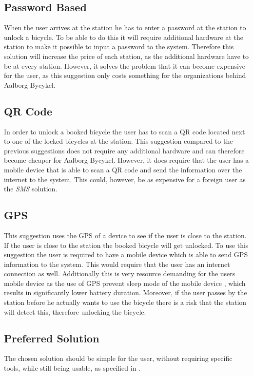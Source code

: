 \subsection{Password Based}
When the user arrives at the station he has to enter a password at the station to unlock a bicycle.
To be able to do this it will require additional hardware at the station to make it possible to input a password to the system.
Therefore this solution will increase the price of each station, as the additional hardware have to be at every station.
However, it solves the problem that it can become expensive for the user, as this suggestion only costs something for the organizations behind Aalborg Bycykel.

\subsection{QR Code}
In order to unlock a booked bicycle the user has to scan a QR code located next to one of the locked bicycles at the station.
This suggestion compared to the previous suggestions does not require any additional hardware and can therefore become cheaper for Aalborg Bycykel.
However, it does require that the user has a mobile device that is able to scan a QR code and send the information over the internet to the system. This could, however, be as expensive for a foreign user as the \textit{SMS} solution.

\subsection{GPS}
This suggestion uses the GPS of a device to see if the user is close to the station.
If the user is close to the station the booked bicycle will get unlocked.
To use this suggestion the user is required to have a mobile device which is able to send GPS information to the system.
This would require that the user has an internet connection as well.
Additionally this is very resource demanding for the users mobile device as the use of GPS prevent sleep mode of the mobile device \citep{misc:gpsbatteryusage}, which results in significantly lower battery duration.
Moreover, if the user passes by the station before he actually wants to use the bicycle there is a risk that the station will detect this, therefore unlocking the bicycle.

\subsection{Preferred Solution}
The chosen solution should be simple for the user, without requiring specific tools, while still being usable, as specified in .

